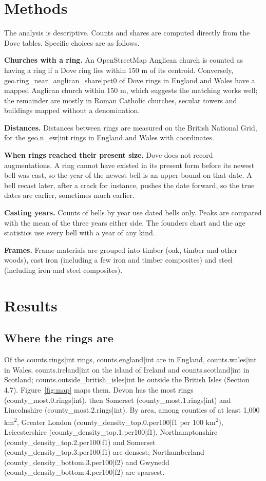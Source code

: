 \documentclass[11pt,a4paper]{article}
\begin{document}
\section{Methods}

The analysis is descriptive. Counts and shares are computed directly from the Dove tables. Specific choices are as follows.

\textbf{Churches with a ring.} An OpenStreetMap Anglican church is counted as having a ring if a Dove ring lies within 150 m of its centroid. Conversely, {{geo.ring_near_anglican_share|pct0}} of Dove rings in England and Wales have a mapped Anglican church within 150 m, which suggests the matching works well; the remainder are mostly in Roman Catholic churches, secular towers and buildings mapped without a denomination.

\textbf{Distances.} Distances between rings are measured on the British National Grid, for the {{geo.n_ew|int}} rings in England and Wales with coordinates.

\textbf{When rings reached their present size.} Dove does not record augmentations. A ring cannot have existed in its present form before its newest bell was cast, so the year of the newest bell is an upper bound on that date. A bell recast later, after a crack for instance, pushes the date forward, so the true dates are earlier, sometimes much earlier.

\textbf{Casting years.} Counts of bells by year use dated bells only. Peaks are compared with the mean of the three years either side. The founders chart and the age statistics use every bell with a year of any kind.

\textbf{Frames.} Frame materials are grouped into timber (oak, timber and other woods), cast iron (including a few iron and timber composites) and steel (including iron and steel composites).

\section{Results}

\subsection{Where the rings are}

Of the {{counts.rings|int}} rings, {{counts.england|int}} are in England, {{counts.wales|int}} in Wales, {{counts.ireland|int}} on the island of Ireland and {{counts.scotland|int}} in Scotland; {{counts.outside_british_isles|int}} lie outside the British Isles (Section 4.7). Figure~\ref{fig:map} maps them. Devon has the most rings ({{county_most.0.rings|int}}), then Somerset ({{county_most.1.rings|int}}) and Lincolnshire ({{county_most.2.rings|int}}). By area, among counties of at least 1,000 km\textsuperscript{2}, Greater London ({{county_density_top.0.per100|f1}} per 100 km\textsuperscript{2}), Leicestershire ({{county_density_top.1.per100|f1}}), Northamptonshire ({{county_density_top.2.per100|f1}}) and Somerset ({{county_density_top.3.per100|f1}}) are densest; Northumberland ({{county_density_bottom.3.per100|f2}}) and Gwynedd ({{county_density_bottom.4.per100|f2}}) are sparsest.
\end{document}
